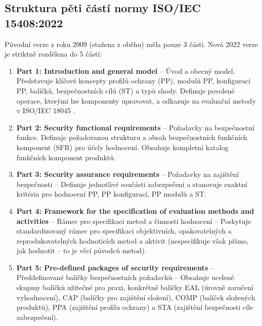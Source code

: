 \documentclass[10pt,a4paper]{article}
\begin{document}
	\subsection{Struktura pěti částí normy ISO/IEC 15408:2022}
	Původní verze z roku 2009 (stažena z oběhu) měla pouze 3 části. Nová 2022 verze je striktně rozdělena do 5 částí:
	\begin{enumerate}
		\item \textbf{Part 1: Introduction and general model} -- Úvod a obecný model. 
		Představuje klíčové koncepty profilů ochrany (PP), modulů PP, konfigurací PP, balíčků, bezpečnostních cílů (ST) a typů shody. Definuje povolené operace, kterými lze komponenty upravovat, a odkazuje na evaluační metody v ISO/IEC 18045 . 
		
		\item \textbf{Part 2: Security functional requirements} -- Požadavky na bezpečnostní funkce. Definuje požadovanou strukturu a obsah bezpečnostních funkčních komponent (SFR) pro účely hodnocení. Obsahuje kompletní katalog funkčních komponent produktů.
		
		\item \textbf{Part 3: Security assurance requirements} -- Požadavky na zajištění bezpečnosti – Definuje jednotlivé součásti zabezpečení a stanovuje exaktní kritéria pro hodnocení PP, PP konfigurací, PP modulů a ST.  
		\item \textbf{Part 4: Framework for the specification of evaluation methods and activities} -- Rámec pro specifikaci metod a činností hodnocení – Poskytuje standardizovaný rámec pro specifikaci objektivních, opakovatelných a reprodukovatelných hodnoticích metod a aktivit (nespecifikuje však přímo, jak hodnotit – to je věcí původců metod). 
		\item \textbf{Part 5: Pre-defined packages of security requirements} -- Předdefinované balíčky bezpečnostních požadavků – Obsahuje ucelené skupiny balíčků užitečné pro praxi, konkrétně balíčky EAL (úrovně zaručení vyhodnocení), CAP (balíčky pro zajištění složení), COMP (balíček složených produktů), PPA (zajištění profilu ochrany) a STA (zajištění bezpečnosti cíle zabezpečení).
	\end{enumerate}
	
\end{document}
